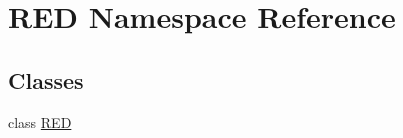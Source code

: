 \hypertarget{namespace_r_e_d}{}\section{R\+ED Namespace Reference}
\label{namespace_r_e_d}
\subsection*{Classes}
\begin{DoxyCompactItemize}
\item 
class \mbox{\hyperlink{class_r_e_d_1_1_r_e_d}{R\+ED}}
\end{DoxyCompactItemize}
